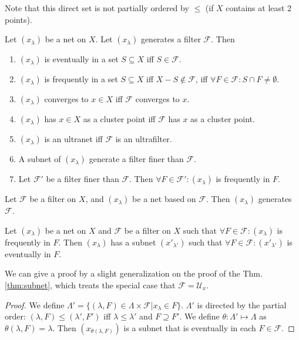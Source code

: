 \documentclass[12pt]{book}
\begin{document}
Note that this direct set is not partially ordered by $\leq$ (if $X$ contains at least 2 points).

\begin{theorem}
	Let $(x_\lambda)$ be a net on $X$. Let $(x_\lambda)$ generates a filter $\mathcal F$. Then
	\begin{enumerate}
		\item $(x_\lambda)$ is eventually in a set $S\subseteq X$ iff $S\in\mathcal F$.
		\item $(x_\lambda)$ is frequently in a set $S\subseteq X$ iff $X-S\not\in\mathcal F$, iff $\forall F\in \mathcal F:S\cap F\neq\emptyset$.
		\item $(x_\lambda)$ converges to $x\in X$ iff $\mathcal F$ converges to $x$.
		\item $(x_\lambda)$ has $x\in X$ as a cluster point iff $\mathcal F$ has $x$ as a cluster point.
		\item $(x_\lambda)$ is an ultranet iff $\mathcal F$ is an ultrafilter.
		\item A subnet of $(x_\lambda)$ generate a filter finer than $\mathcal F$.
		\item Let $\mathcal F'$ be a filter finer than $\mathcal F$. Then $\forall F\in \mathcal F':(x_\lambda)$ is frequently in $F$.
	\end{enumerate}
\end{theorem}

\begin{theorem}
	Let $\mathcal F$ be a filter on $X$, and $(x_\lambda)$ be a net based on $\mathcal F$. Then $(x_\lambda)$ generates $\mathcal F$.
\end{theorem}

\begin{lemma}
	Let $(x_\lambda)$ be a net on $X$ and $\mathcal F$ be a filter on $X$ such that $\forall F\in \mathcal F:(x_\lambda)$ is frequently in $F$. Then $(x_\lambda)$ has a subnet $(x'_{\lambda'})$ such that $\forall F\in \mathcal F:(x'_{\lambda'})$ is eventually in $F$.
\end{lemma}
We can give a proof by a slight generalization on the proof of the Thm. \ref{thm:subnet}, which treats the special case that $\mathcal F=\mathcal U_x$.
\begin{proof}
	We define $\Lambda'=\{(\lambda,F)\in\Lambda\times \mathcal F|x_\lambda\in F\}$. $\Lambda'$ is directed by the partial order: $(\lambda,F)\leq(\lambda',F')$ iff $\lambda\leq\lambda'$ and $F\supseteq F'$. We define $\theta:\Lambda'\mapsto \Lambda$ as $\theta(\lambda,F)=\lambda$. Then $(x_{\theta(\lambda,F)})$ is a subnet that is eventually in each $F\in \mathcal F$.
\end{proof}
\end{document}
